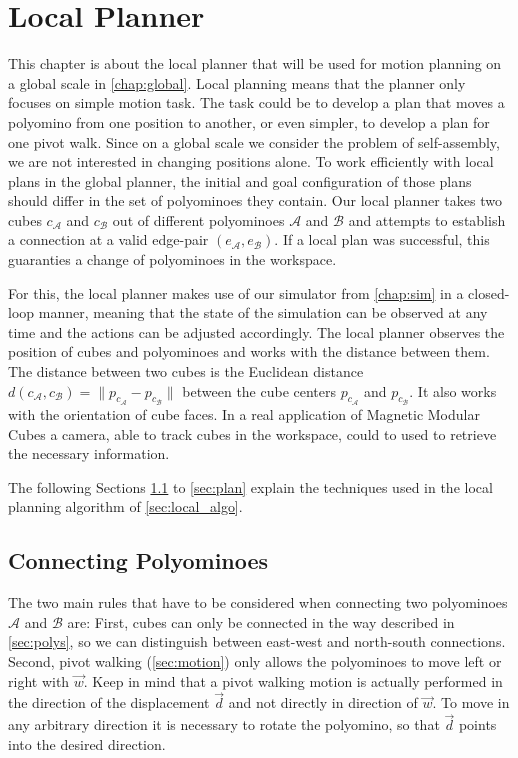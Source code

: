\chapter{Local Planner}
\label{chap:local}

This chapter is about the local planner that will be used for motion planning on a global scale in \autoref{chap:global}.
Local planning means that the planner only focuses on simple motion task.
The task could be to develop a plan that moves a polyomino from one position to another, or even simpler, to develop a plan for one pivot walk.
Since on a global scale we consider the problem of self-assembly, we are not interested in changing positions alone.
To work efficiently with local plans in the global planner, the initial and goal configuration of those plans should differ in the set of polyominoes they contain.
Our local planner takes two cubes $c_\mathcal{A}$ and $c_\mathcal{B}$ out of different polyominoes $\mathcal{A}$ and $\mathcal{B}$ and attempts to establish a connection at a valid edge-pair $(e_\mathcal{A}, e_\mathcal{B})$.
If a local plan was successful, this guaranties a change of polyominoes in the workspace.

For this, the local planner makes use of our simulator from \autoref{chap:sim} in a closed-loop manner, meaning that the state of the simulation can be observed at any time and the actions can be adjusted accordingly.
The local planner observes the position of cubes and polyominoes and works with the distance between them.
The distance between two cubes is the Euclidean distance $d(c_\mathcal{A}, c_\mathcal{B}) = \lVert p_{c_{\mathcal{A}}} - p_{c_{\mathcal{B}}}\rVert$ between the cube centers $p_{c_\mathcal{A}}$ and $p_{c_\mathcal{B}}$.
It also works with the orientation of cube faces.
In a real application of Magnetic Modular Cubes a camera, able to track cubes in the workspace, could to used to retrieve the necessary information. 

The following Sections \ref{sec:connect} to \ref{sec:plan} explain the techniques used in the local planning algorithm of \autoref{sec:local_algo}.

\section{Connecting Polyominoes}
\label{sec:connect}

The two main rules that have to be considered when connecting two polyominoes $\mathcal{A}$ and $\mathcal{B}$ are:
First, cubes can only be connected in the way described in \autoref{sec:polys}, so we can distinguish between east-west and north-south connections.
Second, pivot walking (\autoref{sec:motion}) only allows the polyominoes to move left or right with $\vec{w}$.
Keep in mind that a pivot walking motion is actually performed in the direction of the displacement $\vec{d}$ and not directly in direction of $\vec{w}$.
To move in any arbitrary direction it is necessary to rotate the polyomino, so that $\vec{d}$ points into the desired direction.

